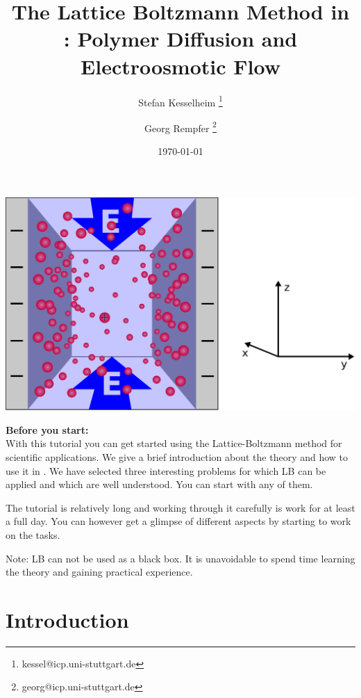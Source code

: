\renewcommand{\d}{\mathrm d}
\subject{ESPResSo Tutorial}
\title{The Lattice Boltzmann Method in \ES{}: 
Polymer Diffusion and Electroosmotic Flow
} \author{ Stefan Kesselheim \thanks{\ttfamily 
kessel@icp.uni-stuttgart.de}  \and  Georg Rempfer \thanks{\ttfamily 
georg@icp.uni-stuttgart.de}}
\date{\today}
\publishers{Institute for Computational Physics, Stuttgart University}
\maketitle 
\begin{center}
  \includegraphics[width=0.5\columnwidth]{figures/schlitzpore_3d.pdf}
\end{center}
\pagebreak
{}
\begin{center}
  \colorbox{mygray}{ 
\begin{minipage}[h]{13cm}
  \textbf{\large Before you start:}\\
  With this tutorial you can get started using the Lattice-Boltzmann method
  for scientific applications. We give a brief introduction about the theory
  and how to use it in \ES{}. 
  We have selected three interesting problems for which LB can be applied
  and which are well understood.  You can start with any of them.
   

  The tutorial is relatively long and working through it carefully
  is work for at least a full day. You can however get a glimpse 
  of different aspects by starting to work on the tasks.


  Note: LB can not be used as a black box. It is unavoidable 
  to spend time learning the theory and gaining practical experience. 
\end{minipage}
}
\end{center}

 \tableofcontents
 \pagebreak
  
\section{Introduction}



